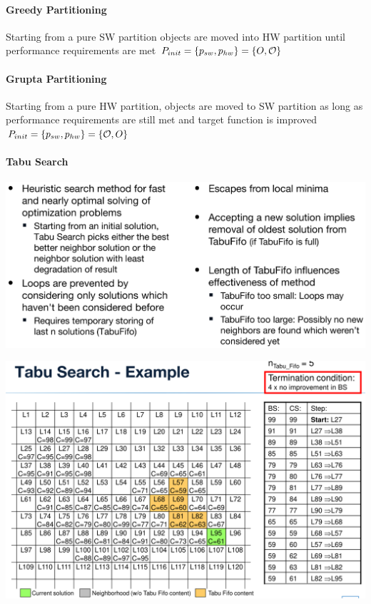 \documentclass[english]{latex4ei/latex4ei_sheet}
\begin{document}
\paragraph{Greedy Partitioning}
Starting from a pure SW partition objects are moved into HW partition until performance requirements are met
$P_{init} = \{ p_{sw}, p_{hw} \} = \{ O, \operatorname{\mathcal O} \}$

\paragraph{Grupta Partitioning}
Starting from a pure HW partition, objects are moved to SW partition as long as performance requirements are still met and target function is improved
$P_{init} = \{ p_{sw}, p_{hw} \} = \{ \operatorname{\mathcal O}, O \}$

\paragraph{Tabu Search}

\begin{center}
  \centering
  \includegraphics[width=\linewidth]{assets/TabuSearch.png}
  \label{fig:tabusearch}
\end{center}

\begin{center}
  \centering
  \includegraphics[width=\linewidth]{assets/TabuExample.png}
  \label{fig:tabuexample}
\end{center}
\end{document}
